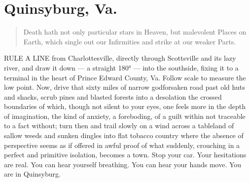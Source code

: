 \chapter{Quinsyburg, Va.}
 
\begin{quotation}
  Death hath not only particular stars in Heaven, but malevolent Places on
Earth, which single out our Infirmities 
and strike at our weaker Parts.
\end{quotation}
\vspace{0.2cm}

RULE A LINE from Charlottesville, directly through Scottsville and its lazy river, 
and draw it down --- a straight 180° --- into the southside, fixing it to a 
terminal in the 
heart of Prince Edward County, Va. Follow scale to measure the low point. Now, 
drive that sixty miles of narrow godforsaken road past old huts and shacks, scrub 
pines and blasted 
forests into a desolation 
the crossed boundaries of which, though 
not silent to your eyes, one feels more in the depth of imagination, the kind of 
anxiety, a foreboding, 
of a guilt within not traceable to a fact without; turn then and 
trail slowly on a wind across a tableland of sallow 
weeds and sunken 
dingles 
into flat tobacco country where the absence of perspective seems as if offered 
in awful proof of what suddenly, crouching in a perfect and primitive 
isolation, becomes a town. 
Stop your car. Your hesitations are real. You can hear yourself breathing. You can 
hear your hands move. You are in Quinsyburg.

